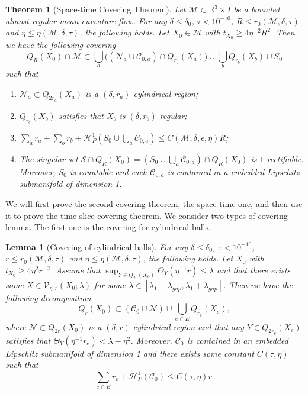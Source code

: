 \documentclass[11pt,reqno]{amsart}
\numberwithin{equation}{section}
\newcommand{\RR}{\mathds{R}}
\newcommand{\cC}{\mathcal{C}}
\newcommand{\cH}{\mathcal{H}}
\newcommand{\cM}{\mathcal{M}}
\newcommand{\cN}{\mathcal{N}}
\newcommand{\cS}{\mathcal{S}}
\newcommand{\cV}{\mathcal{V}}
\newtheorem{theorem}[equation]{Theorem}
\newtheorem{lemma}[equation]{Lemma}
\theoremstyle{definition}
\theoremstyle{remark}
\theoremstyle{remark}
\theoremstyle{remark}
\theoremstyle{remark}\newtheorem{conjecture}[equation]{Conjecture}
\theoremstyle{remark}\newtheorem{question}[equation]{Question}
\begin{document}
\begin{theorem}[Space-time Covering Theorem]\label{t:spacetime cover}
Let $\cM \subset \RR^3 \times I$ be a bounded almost regular mean curvature flow. For any $\delta \le \delta_0$, $\tau<10^{-10}$, $R \le r_0(\cM,\delta,\tau)$ and $\eta \le \eta(\cM,\delta,\tau)$, the following holds. Let $X_0 \in \cM$ with $t_{X_0} \ge 4\eta^{-2}R^2$. Then we have the following covering
\begin{equation}
    Q_R(X_0) \cap \cM \subset \bigcup_a \big((\cN_a \cup \cC_{0,a})\cap Q_{r_a}(X_a) \big) \cup \bigcup_b Q_{r_b}(X_b) \cup S_0 
\end{equation}
such that
\begin{enumerate}
    \item $\cN_a \subset Q_{2r_a}(X_a) $ is a $(\delta,r_a)$-cylindrical region;
    \item $Q_{r_b}(X_b)$ satisfies that $X_b$ is $(\delta,r_b)$-regular;
    \item $\sum_a r_a + \sum_b r_b + \cH^1_P(S_0 \cup \bigcup_a\cC_{0,a}) \le C(\cM,\delta,\epsilon,\eta)R$;
    \item The singular set $\cS\cap Q_R(X_0) = (S_0 \cup \bigcup_a\cC_{0,a})\cap Q_R(X_0)$ is $1$-rectifiable. Moreover, $S_0$ is countable and each $\cC_{0,a}$ is contained in a embedded Lipschitz submanifold of dimension 1.
\end{enumerate}
\end{theorem}

We will first prove the second covering theorem, the space-time one, and then use it to prove the time-slice covering theorem. We consider two types of covering lemma. The first one is the covering for cylindrical balls. 


\begin{lemma}[Covering of cylindrical balls]\label{l:c cover}
 For any $\delta \le \delta_0$, $\tau<10^{-10}$, $r \le r_0(\cM,\delta,\tau)$ and $\eta \le \eta(\cM,\delta,\tau)$, the following holds. Let $X_0$ with $t_{X_0}\ge 4\eta^2 r^{-2}$. Assume that $\sup_{Y\in Q_{2r}(X_0)}\Theta_Y(\eta^{-1}r) \le \lambda$ and that there exists some $X \in \cV_{\eta,r}(X_0;\lambda)$ for some $\lambda \in [\lambda_1 -\lambda_{gap}, \lambda_1 + \lambda_{gap}]$. Then we have the following decomposition
    \begin{equation*}
        Q_r(X_0) \subset (\cC_0 \cup \cN)  \cup \bigcup_{e \in E} Q_{r_e}(X_e),
    \end{equation*}
    where $\cN \subset Q_{2r}(X_0)$ is a $(\delta,r)$-cylindrical region and that any $Y \in Q_{2r_e}(X_e)$ satisfies that $\Theta_Y(\eta^{-1} r_e) < \lambda - \eta^2$. Moreover, $\cC_0$ is contained in an embedded Lipschitz submanifold of dimension 1 and there exists some constant $C(\tau,\eta)$ such that
    \begin{equation*}
        \sum_{e\in E} r_e +  \cH_P^1(\cC_0) \le C(\tau,\eta) r.
    \end{equation*}
\end{lemma}
\end{document}
